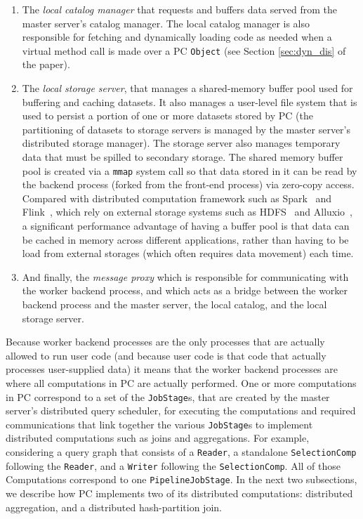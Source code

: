 \begin{enumerate}
\item The \emph{local catalog manager} that requests and 
buffers data served from the master server's catalog manager.  The local catalog manager is also responsible for fetching and dynamically loading
code as needed when a virtual method call is made over a PC \texttt{Object} (see Section \ref{sec:dyn_dis} of the paper).
\item The \emph{local storage server}, that manages a
  shared-memory buffer pool used for buffering and caching datasets.  It also manages
a  user-level file system that is used to persist a portion of one or more datasets stored by PC (the partitioning of datasets to storage servers is managed
by the master server's distributed storage manager).  The storage server also manages temporary data that must be spilled to secondary storage.
The shared memory buffer pool is created via a \texttt{mmap} system call so that
data stored in it can be read by the backend process (forked from
the front-end process) via zero-copy access. Compared with distributed
computation framework such as Spark~\cite{zaharia2010spark} and Flink~\cite{alexandrov2014stratosphere, carbone2015apache}, which rely on
external storage systems such as HDFS~\cite{borthakur2008hdfs} and Alluxio~\cite{li2014tachyon}, a significant
performance advantage of having a buffer pool is that data can be cached in memory
across different applications, rather than having to be load from external
storages (which often requires data movement) each time.
\item And finally, the \emph{message proxy} which is responsible for communicating with the worker backend process, and which acts as a bridge between the
worker backend process and the master server, the local catalog, and the local storage server.

\end{enumerate}

Because worker backend processes are the only processes that are actually allowed to run user code (and because user code is that code that actually processes
user-supplied data) it means that the worker backend processes are
where all computations in PC are actually performed.  One or more computations in PC correspond 
to a set of the 
\texttt{JobStage}s, that are created by the master server's distributed query scheduler, 
for executing the computations and required communications
that link together the various \texttt{JobStage}s to implement distributed
computations such as joins and aggregations. 
For example, considering a query graph that consists of a \texttt{Reader}, a standalone \texttt{SelectionComp} following
the \texttt{Reader}, and a
\texttt{Writer} following the \texttt{SelectionComp}. All of those Computations correspond
to one \texttt{PipelineJobStage}. In the next two subsections, we
describe how PC implements two of its distributed computations:
distributed aggregation, and a distributed hash-partition join.


